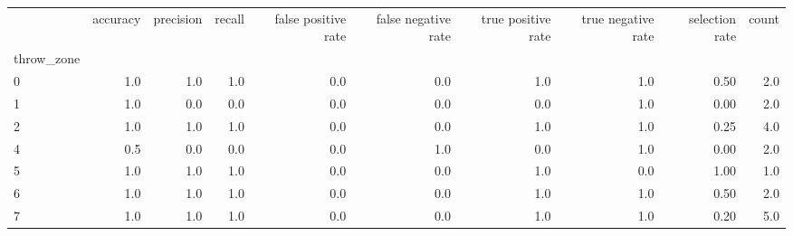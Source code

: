 \begin{tabular}{lrrrrrrrrr}
\toprule
{} &  accuracy &  precision &  recall &  false positive rate &  false negative rate &  true positive rate &  true negative rate &  selection rate &  count \\
throw\_zone &           &            &         &                      &                      &                     &                     &                 &        \\
\midrule
0          &       1.0 &        1.0 &     1.0 &                  0.0 &                  0.0 &                 1.0 &                 1.0 &            0.50 &    2.0 \\
1          &       1.0 &        0.0 &     0.0 &                  0.0 &                  0.0 &                 0.0 &                 1.0 &            0.00 &    2.0 \\
2          &       1.0 &        1.0 &     1.0 &                  0.0 &                  0.0 &                 1.0 &                 1.0 &            0.25 &    4.0 \\
4          &       0.5 &        0.0 &     0.0 &                  0.0 &                  1.0 &                 0.0 &                 1.0 &            0.00 &    2.0 \\
5          &       1.0 &        1.0 &     1.0 &                  0.0 &                  0.0 &                 1.0 &                 0.0 &            1.00 &    1.0 \\
6          &       1.0 &        1.0 &     1.0 &                  0.0 &                  0.0 &                 1.0 &                 1.0 &            0.50 &    2.0 \\
7          &       1.0 &        1.0 &     1.0 &                  0.0 &                  0.0 &                 1.0 &                 1.0 &            0.20 &    5.0 \\
\bottomrule
\end{tabular}
